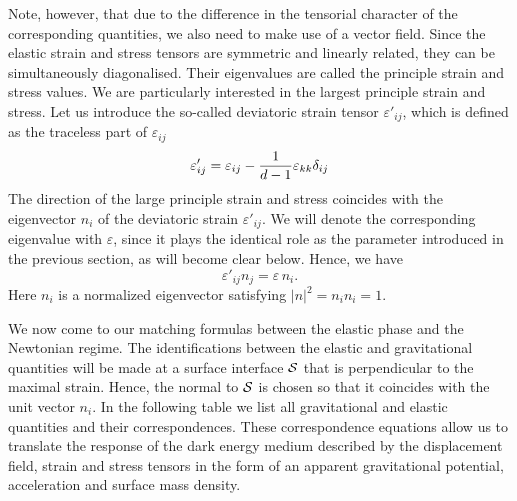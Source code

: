 \documentclass[a4paper,12pt]{article}
\begin{document}
Note, however, that  due to the difference in the tensorial character of the corresponding quantities, we also need to make use of a vector field. 
Since the elastic strain and stress tensors are symmetric and linearly related, they can be simultaneously diagonalised. Their eigenvalues are called the principle strain and stress values. We are particularly interested in the largest principle strain and stress. Let us introduce the so-called deviatoric strain tensor $\varepsilon'_{ij}$, which is defined as the traceless part of $\varepsilon_{ij}$
\begin{equation}
	\varepsilon'_{ij} =\varepsilon_{ij}-{1\over d-1} \varepsilon_{kk} \delta_{ij}
\end{equation}
The direction of the large principle strain and stress coincides with the eigenvector $n_i$  of the deviatoric strain $\varepsilon'_{ij}$. We will denote the corresponding eigenvalue with $\varepsilon$, since  it plays the identical role as the parameter introduced in the previous section, as will become clear below.  Hence, we have
\begin{equation}
\label{principlestrain}
	\varepsilon'_{ij} n_j = \varepsilon\, n_i. %
\end{equation}
Here $n_i$ is a normalized eigenvector satisfying $|n|^2 = n_in_i=1$. %

We now come to our matching formulas between the elastic phase and the Newtonian regime.
The identifications between the elastic and gravitational quantities will be made at a surface 
interface $\cal S$ that is perpendicular to the maximal strain. Hence, the normal to $\cal S$  is chosen so that it coincides with the unit vector $n_i$. 
In the following table we list all gravitational and elastic quantities and their 
correspondences.  These correspondence equations  allow us to translate the response of the dark energy medium described by the displacement field, strain and stress tensors in the form of an apparent gravitational potential, acceleration and surface mass density. 
\end{document}
